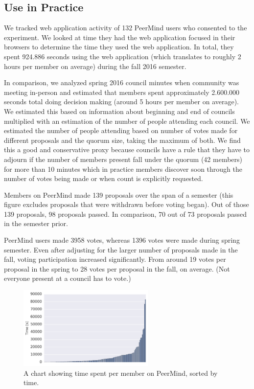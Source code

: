 \documentclass[format=acmsmall, review=true, screen=true, anonymous=true]{acmart}
\begin{document}
\subsection{Use in Practice}

We tracked web application activity of 132 PeerMind users who consented to the experiment.
We looked at time they had the web application focused in their browsers to determine the
time they used the web application.
In total, they spent 924.886 seconds using the web application (which translates to roughly 2 hours
per member on average) during the fall 2016 semester.

In comparison, we analyzed spring 2016 council minutes when community was meeting in-person and
estimated that members spent approximately 2.600.000 seconds total doing decision making
(around 5 hours per member on average).
We estimated this based on information about beginning and end of councils multiplied
with an estimation of the number of people attending each council.
We estimated the number of people attending based on number of votes made for different proposals
and the quorum size, taking the maximum of both.
We find this a good and conservative proxy because councils have a rule that they have to adjourn
if the number of members present fall under the quorum (42 members) for more than 10 minutes
which in practice members discover soon through the number of votes being made or when count
is explicitly requested.

Members on PeerMind made 139 proposals over the span of a semester (this figure
excludes proposals that were withdrawn before voting began).
Out of those 139 proposals, 98 proposals passed. In comparison, 70 out of 73 proposals passed
in the semester prior.

PeerMind users made 3958 votes, whereas 1396 votes were made during spring semester.
Even after adjusting for the larger number of proposals made in the fall, voting participation
increased significantly.
From around 19 votes per proposal in the spring to 28 votes per proposal in the fall, on average.
(Not everyone present at a council has to vote.)

\begin{figure}[ht]
\centering
\includegraphics[width=0.6\textwidth]{figures/people-sorted-time-chart.png}
\caption{A chart showing time spent per member on PeerMind, sorted by time.}
\label{fig:time}
\end{figure}
\end{document}
